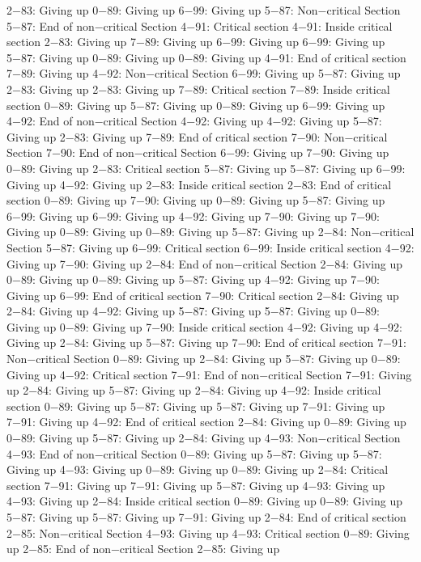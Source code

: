 2−83: Giving up
0−89: Giving up
6−99: Giving up
5−87: Non−critical Section
5−87: End of non−critical Section
4−91: Critical section
4−91: Inside critical section
2−83: Giving up
7−89: Giving up
6−99: Giving up
6−99: Giving up
5−87: Giving up
0−89: Giving up
0−89: Giving up
4−91: End of critical section
7−89: Giving up
4−92: Non−critical Section
6−99: Giving up
5−87: Giving up
2−83: Giving up
2−83: Giving up
7−89: Critical section
7−89: Inside critical section
0−89: Giving up
5−87: Giving up
0−89: Giving up
6−99: Giving up
4−92: End of non−critical Section
4−92: Giving up
4−92: Giving up
5−87: Giving up
2−83: Giving up
7−89: End of critical section
7−90: Non−critical Section
7−90: End of non−critical Section
6−99: Giving up
7−90: Giving up
0−89: Giving up
2−83: Critical section
5−87: Giving up
5−87: Giving up
6−99: Giving up
4−92: Giving up
2−83: Inside critical section
2−83: End of critical section
0−89: Giving up
7−90: Giving up
0−89: Giving up
5−87: Giving up
6−99: Giving up
6−99: Giving up
4−92: Giving up
7−90: Giving up
7−90: Giving up
0−89: Giving up
0−89: Giving up
5−87: Giving up
2−84: Non−critical Section
5−87: Giving up
6−99: Critical section
6−99: Inside critical section
4−92: Giving up
7−90: Giving up
2−84: End of non−critical Section
2−84: Giving up
0−89: Giving up
0−89: Giving up
5−87: Giving up
4−92: Giving up
7−90: Giving up
6−99: End of critical section
7−90: Critical section
2−84: Giving up
2−84: Giving up
4−92: Giving up
5−87: Giving up
5−87: Giving up
0−89: Giving up
0−89: Giving up
7−90: Inside critical section
4−92: Giving up
4−92: Giving up
2−84: Giving up
5−87: Giving up
7−90: End of critical section
7−91: Non−critical Section
0−89: Giving up
2−84: Giving up
5−87: Giving up
0−89: Giving up
4−92: Critical section
7−91: End of non−critical Section
7−91: Giving up
2−84: Giving up
5−87: Giving up
2−84: Giving up
4−92: Inside critical section
0−89: Giving up
5−87: Giving up
5−87: Giving up
7−91: Giving up
7−91: Giving up
4−92: End of critical section
2−84: Giving up
0−89: Giving up
0−89: Giving up
5−87: Giving up
2−84: Giving up
4−93: Non−critical Section
4−93: End of non−critical Section
0−89: Giving up
5−87: Giving up
5−87: Giving up
4−93: Giving up
0−89: Giving up
0−89: Giving up
2−84: Critical section
7−91: Giving up
7−91: Giving up
5−87: Giving up
4−93: Giving up
4−93: Giving up
2−84: Inside critical section
0−89: Giving up
0−89: Giving up
5−87: Giving up
5−87: Giving up
7−91: Giving up
2−84: End of critical section
2−85: Non−critical Section
4−93: Giving up
4−93: Critical section
0−89: Giving up
2−85: End of non−critical Section
2−85: Giving up
